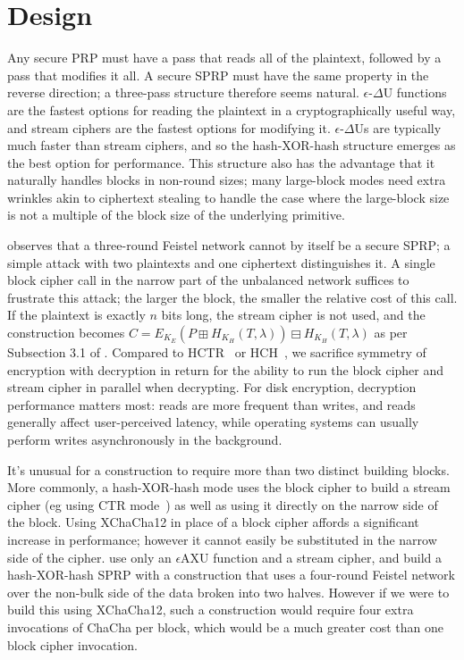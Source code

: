 \documentclass[eprint.tex]{subfiles}
\begin{document}
\section{Design}
Any secure PRP must have a pass that reads all of the plaintext, followed by a pass that modifies
it all. A secure SPRP must have the same property in the reverse direction;
a three-pass structure therefore seems natural.
$\epsilon$-$\Delta$U functions are the fastest options for reading the plaintext in a
cryptographically useful way, and stream ciphers are the fastest options for modifying it.
$\epsilon$-$\Delta$Us
are typically much faster than stream ciphers, and so the hash-XOR-hash structure emerges as
the best option for performance. This structure also has the advantage that it naturally handles
blocks in non-round sizes; many large-block modes need extra wrinkles akin to ciphertext stealing
to handle the case where the large-block size is not
a multiple of the block size of the underlying primitive.

\cite{luby-rackoff} observes that a three-round Feistel network cannot by itself be a secure SPRP;
a simple attack with two plaintexts and one ciphertext distinguishes it. A single block cipher call
in the narrow part of the unbalanced network suffices to frustrate this attack; the
larger the block, the smaller the relative cost of this call. If the plaintext is exactly $n$ bits
long, the stream cipher is not used, and the construction becomes
$C = E_{K_E}(P \boxplus H_{K_H}(T, \lambda)) \boxminus H_{K_H}(T, \lambda)$
as per Subsection 3.1 of \cite{tweakable}.
Compared to HCTR~\cite{hctr} or HCH~\cite{hch}, we sacrifice
symmetry of encryption with decryption in return for
the ability to run the block cipher and stream cipher in parallel when decrypting.
For disk encryption, decryption performance matters most:
reads are more frequent than writes, and reads generally affect user-perceived latency, while
operating systems can usually perform writes asynchronously in the background.

It's unusual for a construction to require more than two distinct building blocks.
More commonly, a hash-XOR-hash mode uses the block cipher to build a stream cipher
(eg using CTR mode~\cite{ctr})
as well as using it directly on the narrow side of the block.
Using XChaCha12 in place of a block cipher affords a significant increase in performance;
however it cannot easily be substituted in the narrow side of the cipher.
\cite{sarkar1,sarkar2,sarkar3,sarkar4} use only an $\epsilon$AXU function
and a stream cipher, and build a hash-XOR-hash SPRP
with a construction that uses a four-round Feistel network over the non-bulk side of the data
broken into two halves. However if we were to build this using XChaCha12,
such a construction would require four extra invocations of ChaCha per block, which would be
a much greater cost than one block cipher invocation.
\end{document}
